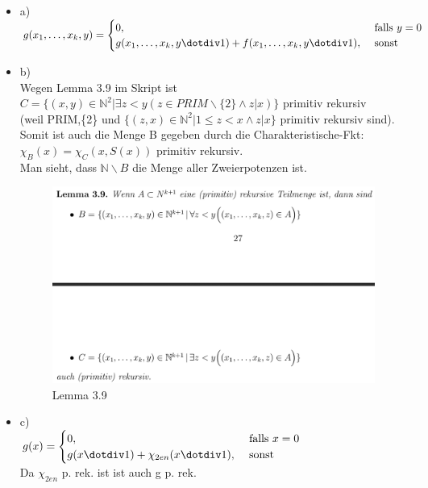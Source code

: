 \documentclass[a4paper]{scrartcl}%
\begin{document}
    \begin{itemize}
        \item a)\\
            $g(x_1,\dots,x_k,y) =
            \begin{cases}
                0, &\text{ falls }y = 0\\
                g(x_1,\dots,x_k, y\dotdiv 1) + f(x_1,\dots,x_k,y\dotdiv 1), &\text{ sonst }\\
            \end{cases}$ 
        \item b)\\
            Wegen Lemma 3.9 im Skript ist\\ 
            $C = \{(x,y) \in \mathds{N}^2 | \exists z < y (z \in PRIM\backslash \{2\} \land z|x)\}$ primitiv rekursiv\\
            (weil PRIM,\{2\} und $\{(z,x) \in \mathds{N}^2| 1 \leq z < x \land z|x\}$ primitiv rekursiv sind).\\
            Somit ist auch die Menge B gegeben durch die Charakteristische-Fkt:\\
            $\chi_B(x) = \chi_C(x,S(x))$ primitiv rekursiv.\\
            Man sieht, dass $ \mathds{N}\backslash B$ die Menge aller Zweierpotenzen ist.\\
            \begin{figure}[H]
                \centering
                \includegraphics[scale=0.3]{./Lemma-3-9.png}
                \caption{Lemma 3.9}
                \label{fig:./Lemma-3-9}
            \end{figure}
            
        \item c)\\
            $g(x) =
            \begin{cases}
                0, &\text{ falls }x = 0\\
                g(x\dotdiv 1) + \chi_{2en}(x\dotdiv 1), &\text{ sonst }\\
            \end{cases}$\\
            Da $\chi_{2en}$ p. rek. ist ist auch g p. rek.
    \end{itemize}
\end{document}
